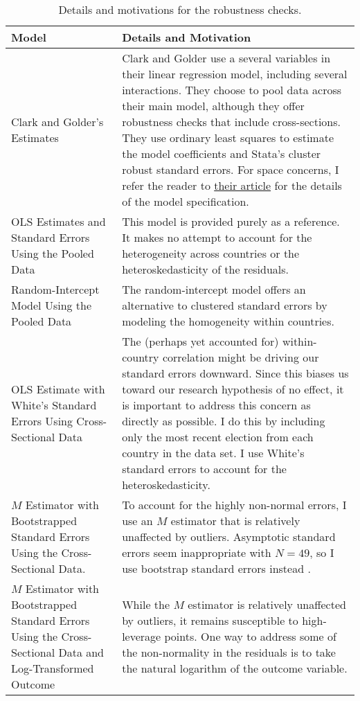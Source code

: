 \documentclass[12pt]{article}
\begin{document}
\begin{table}[h!]
\begin{center}
\begin{footnotesize}
\begin{tabular}{|p{6cm}|p{10cm}|}
\hline
Model & Details and Motivation\\\hline
Clark and Golder's Estimates & Clark and Golder use a several variables in their linear regression model, including several interactions. They choose to pool data across their main model, although they offer robustness checks that include cross-sections. They use ordinary least squares to estimate the model coefficients and Stata's cluster robust standard errors. For space concerns, I refer the reader to \href{https://files.nyu.edu/mrg217/public/cps_duverger.pdf}{their article} for the details of the model specification. \\\hline
OLS Estimates and Standard Errors Using the Pooled Data & This model is provided purely as a reference. It makes no attempt to account for the heterogeneity across countries or the heteroskedasticity of the residuals.\\\hline
Random-Intercept Model Using the Pooled Data & The random-intercept model \citep{SteenbergenJones2002, GelmanHill2007} offers an alternative to clustered standard errors by modeling the homogeneity within countries.\\\hline
OLS Estimate with White's Standard Errors Using Cross-Sectional Data & The (perhaps yet accounted for) within-country correlation might be driving our standard errors downward. Since this biases us toward our research hypothesis of no effect, it is important to address this concern as directly as possible. I do this by including only the most recent election from each country in the data set. I use White's standard errors \citep{White1980} to account for the heteroskedasticity.\\\hline
$M$ Estimator with Bootstrapped Standard Errors Using the Cross-Sectional Data. & To account for the highly non-normal errors, I use an $M$ estimator \citep{Huber2009} that is relatively unaffected by outliers. Asymptotic standard errors seem inappropriate with $N = 49$, so I use bootstrap standard errors instead \citep{Mooney1993}.\\\hline
$M$ Estimator with Bootstrapped Standard Errors Using the Cross-Sectional Data and Log-Transformed Outcome & While the $M$ estimator is relatively unaffected by outliers, it remains susceptible to high-leverage points. One way to address some of the non-normality in the residuals is to take the natural logarithm of the outcome variable.\\\hline 
\end{tabular}\caption{Details and motivations for the robustness checks.}\label{tab:robust}
\end{footnotesize}
\end{center}
\end{table}
\end{document}
